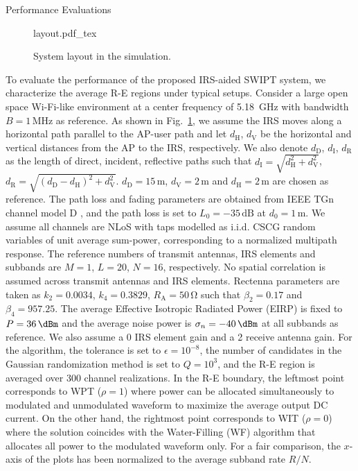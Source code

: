 \documentclass[journal]{IEEEtran}
\begin{document}
	\begin{section}{Performance Evaluations}\label{se:performance_evaluation}
		\begin{figure}[!t]
			\centering
			\def\svgwidth{0.9\columnwidth}
			{layout.pdf_tex}
			\caption{System layout in the simulation.}
			\label{fi:layout}
		\end{figure}
		To evaluate the performance of the proposed IRS-aided SWIPT system, we characterize the average R-E regions under typical setups. Consider a large open space Wi-Fi-like environment at a center frequency of \SI{5.18}{\GHz} with bandwidth $B=1\,\si{\MHz}$ as reference. As shown in Fig.~\ref{fi:layout}, we assume the IRS moves along a horizontal path parallel to the AP-user path and let $d_{\mathrm{H}}$, $d_{\mathrm{V}}$ be the horizontal and vertical distances from the AP to the IRS, respectively. We also denote $d_{\mathrm{D}}$, $d_{\mathrm{I}}$, $d_{\mathrm{R}}$ as the length of direct, incident, reflective paths such that $d_{\mathrm{I}}=\sqrt{d_{\mathrm{H}}^2+d_{\mathrm{V}}^2}$, $d_{\mathrm{R}}=\sqrt{(d_{\mathrm{D}}-d_{\mathrm{H}})^2+d_{\mathrm{V}}^2}$. $d_{\mathrm{D}}=15\,\si{\meter}$, $d_{\mathrm{V}}=2\,\si{\meter}$ and $d_{\mathrm{H}}=2\,\si{\meter}$ are chosen as reference. The path loss and fading parameters are obtained from IEEE TGn channel model D \cite{Erceg2004}, and the path loss is set to $L_0=-35\,\si{\dB}$ at $d_0=1\,\si{\meter}$. We assume all channels are NLoS with taps modelled as i.i.d. CSCG random variables of unit average sum-power, corresponding to a normalized multipath response. The reference numbers of transmit antennas, IRS elements and subbands are $M=1$, $L=20$, $N=16$, respectively. No spatial correlation is assumed across transmit antennas and IRS elements. Rectenna parameters are taken as $k_2=0.0034$, $k_4=0.3829$, $R_{\mathrm{A}}=50\,\si{\ohm}$ such that $\beta_2=0.17$ and $\beta_4=957.25$. The average Effective Isotropic Radiated Power (EIRP) is fixed to $P=36\,\si{\dBm}$ and the average noise power is $\sigma_n=-40\,\si{\dBm}$ at all subbands as reference. We also assume a \SI{0}{\dBi} IRS element gain and a \SI{2}{\dBi} receive antenna gain. For the algorithm, the tolerance is set to $\epsilon=10^{-8}$, the number of candidates in the Gaussian randomization method is set to $Q=10^{3}$, and the R-E region is averaged over \num{300} channel realizations. In the R-E boundary, the leftmost point corresponds to WPT ($\rho=1$) where power can be allocated simultaneously to modulated and unmodulated waveform to maximize the average output DC current.
		On the other hand, the rightmost point corresponds to WIT ($\rho=0$) where the solution coincides with the Water-Filling (WF) algorithm that allocates all power to the modulated waveform only. For a fair comparison, the $x$-axis of the plots has been normalized to the average subband rate $R/N$.


\end{section}
\end{document}

